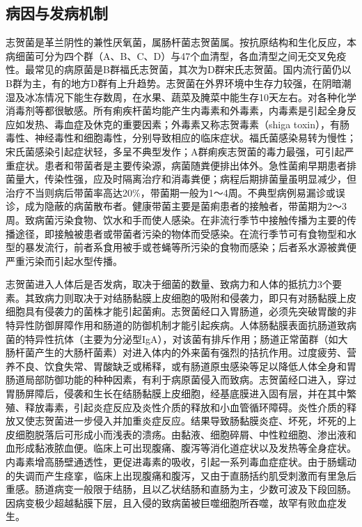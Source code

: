 \subsection{病因与发病机制}

志贺菌是革兰阴性的兼性厌氧菌，属肠杆菌志贺菌属。按抗原结构和生化反应，本病细菌可分为四个群（A、B、C、D）与47个血清型，各血清型之间无交叉免疫性。最常见的病原菌是B群福氏志贺菌，其次为D群宋氏志贺菌。国内流行菌仍以B群为主，有的地方D群有上升趋势。志贺菌在外界环境中生存力较强，在阴暗潮湿及冰冻情况下能生存数周，在水果、蔬菜及腌菜中能生存10天左右。对各种化学消毒剂等都很敏感。所有痢疾杆菌均能产生内毒素和外毒素，内毒素是引起全身反应如发热、毒血症及休克的重要因素；外毒素又称志贺毒素（shiga
toxin），有肠毒性、神经毒性和细胞毒性，分别导致相应的临床症状。福氏菌感染易转为慢性；宋氏菌感染引起症状轻，多呈不典型发作；A群痢疾志贺菌的毒力最强，可引起严重症状。患者和带菌者是主要传染源，病菌随粪便排出体外。急性菌痢早期患者排菌量大，传染性强，应及时隔离治疗和消毒粪便；病程后期排菌量虽明显减少，但治疗不当则病后带菌率高达20\%，带菌期一般为1～4周。不典型病例易漏诊或误诊，成为隐蔽的病菌散布者。健康带菌主要是菌痢患者的接触者，带菌期为2～3周。致病菌污染食物、饮水和手而使人感染。在非流行季节中接触传播为主要的传播途径，即接触被患者或带菌者污染的物体而受感染。在流行季节可有食物型和水型的暴发流行，前者系食用被手或苍蝇等所污染的食物而感染；后者系水源被粪便严重污染而引起水型传播。

志贺菌进入人体后是否发病，取决于细菌的数量、致病力和人体的抵抗力3个要素。其致病力则取决于对结肠黏膜上皮细胞的吸附和侵袭力，即只有对肠黏膜上皮细胞具有侵袭力的菌株才能引起菌痢。志贺菌经口入胃肠道，必须先突破胃酸的非特异性防御屏障作用和肠道的防御机制才能引起疾病。人体肠黏膜表面抗肠道致病菌的特异性抗体（主要为分泌型IgA），对该菌有排斥作用；肠道正常菌群（如大肠杆菌产生的大肠杆菌素）对进入体内的外来菌有强烈的拮抗作用。过度疲劳、营养不良、饮食失常、胃酸缺乏或稀释，或有肠道原虫感染等足以降低人体全身和胃肠道局部防御功能的种种因素，有利于病原菌侵入而致病。志贺菌经口进入，穿过胃肠屏障后，侵袭和生长在结肠黏膜上皮细胞，经基底膜进入固有层，并在其中繁殖、释放毒素，引起炎症反应及炎性介质的释放和小血管循环障碍。炎性介质的释放又使志贺菌进一步侵入并加重炎症反应。结果导致肠黏膜炎症、坏死，坏死的上皮细胞脱落后可形成小而浅表的溃疡。由黏液、细胞碎屑、中性粒细胞、渗出液和血形成黏液脓血便。临床上可出现腹痛、腹泻等消化道症状以及发热等全身症状。内毒素增高肠壁通透性，更促进毒素的吸收，引起一系列毒血症症状。由于肠蠕动的失调而产生痉挛，临床上出现腹痛和腹泻，又由于直肠括约肌受刺激而有里急后重感。肠道病变一般限于结肠，且以乙状结肠和直肠为主，少数可波及下段回肠。因病变极少超越黏膜下层，且入侵的致病菌被巨噬细胞所吞噬，故罕有败血症发生。

